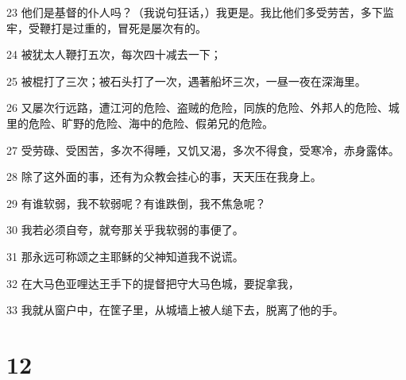 \par 23 他们是基督的仆人吗？（我说句狂话，）我更是。我比他们多受劳苦，多下监牢，受鞭打是过重的，冒死是屡次有的。
\par 24 被犹太人鞭打五次，每次四十减去一下；
\par 25 被棍打了三次；被石头打了一次，遇著船坏三次，一昼一夜在深海里。
\par 26 又屡次行远路，遭江河的危险、盗贼的危险，同族的危险、外邦人的危险、城里的危险、旷野的危险、海中的危险、假弟兄的危险。
\par 27 受劳碌、受困苦，多次不得睡，又饥又渴，多次不得食，受寒冷，赤身露体。
\par 28 除了这外面的事，还有为众教会挂心的事，天天压在我身上。
\par 29 有谁软弱，我不软弱呢？有谁跌倒，我不焦急呢？
\par 30 我若必须自夸，就夸那关乎我软弱的事便了。
\par 31 那永远可称颂之主耶稣的父神知道我不说谎。
\par 32 在大马色亚哩达王手下的提督把守大马色城，要捉拿我，
\par 33 我就从窗户中，在筐子里，从城墙上被人缒下去，脱离了他的手。

\chapter{12}

